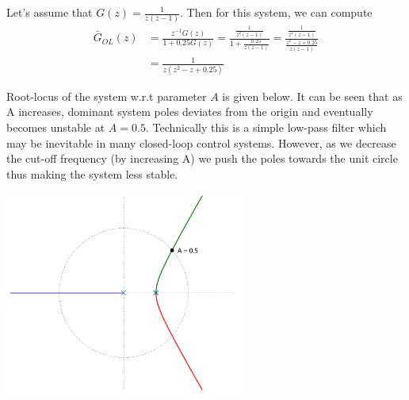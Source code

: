 \documentclass[twoside]{article}
\begin{document}
Let's assume that $G(z) = \frac{1}{z(z-1)}$. Then for this
system, we can compute
%
\begin{align*}
  \bar{G}_{OL}(z) &= \frac{z^{-1} G(z)}{1 + 0.25 G(z)}
= \frac{\frac{1}{z^2(z-1)}}{1 + \frac{0.25}{z(z-1)}}
= \frac{\frac{1}{z^2(z-1)}}{\frac{z^2 - z + 0.25}{z(z-1)}}
\\
&= \frac{1}{z (z^2 -z + 0.25)}
\end{align*}

Root-locus of the system w.r.t parameter $A$ is given below. It
can be seen that as A increases, dominant system poles deviates
from the origin and eventually becomes unstable at $A = 0.5$.
Technically this is a simple low-pass filter which may be inevitable
in many closed-loop control systems. However, as we decrease 
the cut-off frequency (by increasing A) we push the poles towards 
the unit circle thus making the system less stable.

\begin{center}
\begin{minipage}[h]{\linewidth}
    \begin{center}
      \includegraphics[width=0.6\textwidth]{rlocusA}
    \end{center}
\end{minipage}
\end{center}

\end{document}
